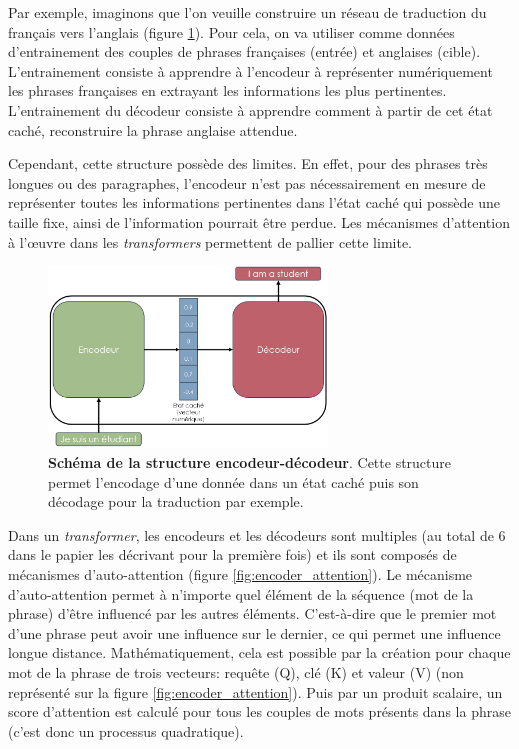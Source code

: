 Par exemple, imaginons que l'on veuille construire un réseau de traduction du français vers l’anglais (figure \ref{fig:encoder_decoder}). Pour cela, on va utiliser comme données d'entrainement des couples de phrases françaises (entrée) et anglaises (cible). L'entrainement consiste à apprendre à l'encodeur à représenter numériquement les phrases françaises en extrayant les informations les plus pertinentes. L'entrainement du décodeur consiste à apprendre comment à partir de cet état caché, reconstruire la phrase anglaise attendue.


Cependant, cette structure possède des limites. En effet, pour des phrases très longues ou des paragraphes, l'encodeur n'est pas nécessairement en mesure de représenter toutes les informations pertinentes dans l'état caché qui possède une taille fixe, ainsi de l'information pourrait être perdue. Les mécanismes d'attention à l'œuvre dans les \textit{transformers} permettent de pallier cette limite.
\begin{figure}[!htbp]
 \centering
 \includegraphics[width=0.66\textwidth]{figures/encoder_decoder.png}
 \caption[Schéma de la structure encodeur-décodeur]{\textbf{Schéma de la structure encodeur-décodeur}. Cette structure permet l'encodage d'une donnée dans un état caché puis son décodage pour la traduction par exemple. }
 \label{fig:encoder_decoder}
\end{figure}

Dans un \textit{transformer}, les encodeurs et les décodeurs sont multiples (au total de 6 dans le papier les décrivant pour la première fois) et ils sont composés de mécanismes d'auto-attention (figure \ref{fig:encoder_attention}). Le mécanisme d'auto-attention permet à n'importe quel élément de la séquence (mot de la phrase) d'être influencé par les autres éléments. C'est-à-dire que le premier mot d'une phrase peut avoir une influence sur le dernier, ce qui permet une influence longue distance. Mathématiquement, cela est possible par la création pour chaque mot de la phrase de trois vecteurs: requête (Q), clé (K) et valeur (V) (non représenté sur la figure \ref{fig:encoder_attention}). Puis par un produit scalaire, un score d'attention est calculé pour tous les couples de mots présents dans la phrase (c'est donc un processus quadratique).



